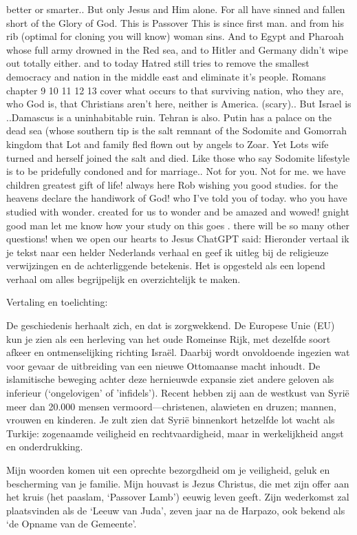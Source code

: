 better or smarter.. But only Jesus and Him alone.  For all have sinned and fallen short of the Glory of God. This is Passover This is since first man.  and from his rib (optimal for cloning you will know) woman sins. And to Egypt and Pharoah whose full army drowned in the Red sea, and to Hitler and Germany didn't wipe out totally either.  and to today Hatred still tries to remove the smallest democracy and nation in the middle east and eliminate it's people.  Romans chapter 9 10 11 12 13 cover what occurs to that surviving nation, who they are, who God is, that Christians aren't here, neither is America. (scary).. But Israel is ..Damascus is a uninhabitable ruin. Tehran is also. Putin has a palace on the dead sea (whose southern tip is the salt remnant of the Sodomite and Gomorrah kingdom that Lot and family fled flown out by angels to Zoar. Yet Lots wife turned and herself joined the salt and died.   Like those who say Sodomite lifestyle is to be pridefully condoned and for marriage.. Not for you.  Not for me.  we have children greatest gift of life!  always here Rob wishing you good studies.  for the heavens declare the handiwork of God! who I've told you of today.  who you have studied with wonder.  created for us to wonder and be amazed and wowed! gnight good man let me know how your study on this goes
. there will be so many other questions! when we open our hearts to Jesus
ChatGPT said:
Hieronder vertaal ik je tekst naar een helder Nederlands verhaal en geef ik uitleg bij de religieuze verwijzingen en de achterliggende betekenis. Het is opgesteld als een lopend verhaal om alles begrijpelijk en overzichtelijk te maken.

Vertaling en toelichting:

De geschiedenis herhaalt zich, en dat is zorgwekkend. De Europese Unie (EU) kun je zien als een herleving van het oude Romeinse Rijk, met dezelfde soort afkeer en ontmenselijking richting Israël. Daarbij wordt onvoldoende ingezien wat voor gevaar de uitbreiding van een nieuwe Ottomaanse macht inhoudt. De islamitische beweging achter deze hernieuwde expansie ziet andere geloven als inferieur (‘ongelovigen’ of 'infidels'). Recent hebben zij aan de westkust van Syrië meer dan 20.000 mensen vermoord—christenen, alawieten en druzen; mannen, vrouwen en kinderen. Je zult zien dat Syrië binnenkort hetzelfde lot wacht als Turkije: zogenaamde veiligheid en rechtvaardigheid, maar in werkelijkheid angst en onderdrukking.

Mijn woorden komen uit een oprechte bezorgdheid om je veiligheid, geluk en bescherming van je familie. Mijn houvast is Jezus Christus, die met zijn offer aan het kruis (het paaslam, ‘Passover Lamb’) eeuwig leven geeft. Zijn wederkomst zal plaatsvinden als de ‘Leeuw van Juda’, zeven jaar na de Harpazo, ook bekend als ‘de Opname van de Gemeente’.

